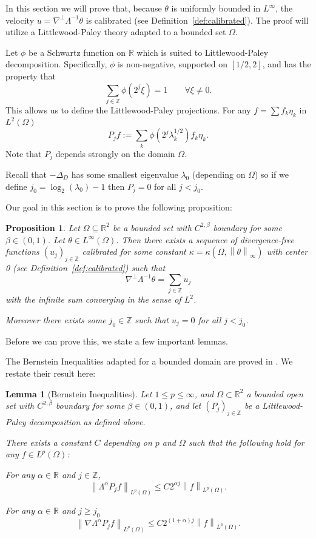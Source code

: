 \documentclass[11pt]{amsart}
\newtheorem{proposition}[theorem]{Proposition}
\newtheorem{lemma}[theorem]{Lemma}
\theoremstyle{remark}
\theoremstyle{definition}
\newcommand{\R}{\mathbb{R}}
\newcommand{\Z}{\mathbb{Z}}
\newcommand{\norm}[1]{\left\lVert#1\right\rVert}
\newcommand{\grad}{\nabla}
\newcommand{\Laplace}{\Delta}
\newcommand{\eigen}[1]{\eta_{#1}} %
\begin{document}
In this section we will prove that, because $\theta$ is uniformly bounded in $L^\infty$, the velocity $u = \grad^\perp \Lambda^{-1} \theta$ is calibrated (see Definition~\ref{def:calibrated}).  The proof will utilize a Littlewood-Paley theory adapted to a bounded set $\Omega$.  

Let $\phi$ be a Schwartz function on $\R$ which is suited to Littlewood-Paley decomposition.  Specifically, $\phi$ is non-negative, supported on $[1/2,2]$, and has the property that
\[ \sum_{j \in \Z} \phi(2^j \xi) = 1 \qquad \forall \xi \neq 0. \]
This allows us to define the Littlewood-Paley projections.  For any $f = \sum f_k \eigen{k}$ in $L^2(\Omega)$
\[ P_j f := \sum_k \phi(2^j \lambda_k^{1/2}) f_k \eigen{k}. \]
Note that $P_j$ depends strongly on the domain $\Omega$.  

Recall that $-\Laplace_D$ has some smallest eigenvalue $\lambda_0$ (depending on $\Omega$) so if we define $j_0 = \log_2(\lambda_0)-1$ then $P_j = 0$ for all $j < j_0$.

Our goal in this section is to prove the following proposition:

\begin{proposition} \label{thm:u is calibrated}
Let $\Omega \subseteq \R^2$ be a bounded set with $C^{2,\beta}$ boundary for some $\beta \in (0,1)$.  Let $\theta \in L^\infty(\Omega)$.  Then there exists a sequence of divergence-free functions $(u_j)_{j \in \Z}$ calibrated for some constant $\kappa = \kappa(\Omega, \norm{\theta}_\infty)$ with center 0 (see Definition~\ref{def:calibrated}) such that
\[ \grad^\perp \Lambda^{-1} \theta = \sum_{j \in \Z} u_j \]
with the infinite sum converging in the sense of $L^2$.  

Moreover there exists some $j_0 \in \Z$ such that $u_j = 0$ for all $j < j_0$.  
\end{proposition}

Before we can prove this, we state a few important lemmas.  

The Bernstein Inequalities adapted for a bounded domain are proved in \cite{IMTb}.  We restate their result here:
\begin{lemma}[Bernstein Inequalities] \label{thm:IMT stuff}
Let $1 \leq p \leq \infty$, and $\Omega \subset \R^2$ a bounded open set with $C^{2,\beta}$ boundary for some $\beta \in (0,1)$, and let $(P_j)_{j \in \Z}$ be a Littlewood-Paley decomposition as defined above.  

There exists a constant $C$ depending on $p$ and $\Omega$ such that the following hold for any $f \in L^p(\Omega)$:

For any $\alpha \in \R$ and $j \in \Z$, 
\[ \norm{\Lambda^\alpha P_j f}_{L^p(\Omega)} \leq C 2^{\alpha j} \norm{f}_{L^p(\Omega)}. \]

For any $\alpha \in \R$ and $j \geq j_0$
\[ \norm{\grad \Lambda^\alpha P_j f}_{L^p(\Omega)} \leq C 2^{(1+\alpha) j} \norm{f}_{L^p(\Omega)}. \]
\end{lemma}
\end{document}
